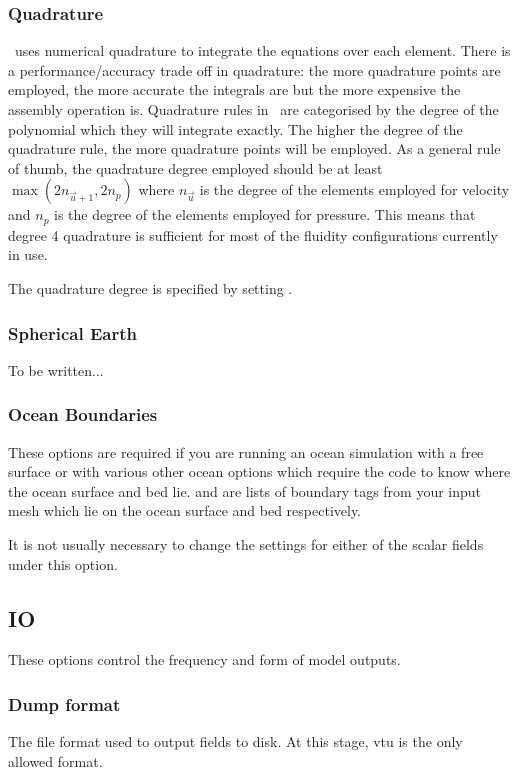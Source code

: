\subsubsection{Quadrature}
\fluidity\ uses numerical quadrature to integrate the equations over each
element. There is a performance/accuracy trade off in quadrature: the more
quadrature points are employed, the more accurate the integrals are but
the more expensive the assembly operation is. Quadrature rules in \fluidity\ are categorised by the degree of the polynomial which they will integrate
exactly. The higher the degree of the quadrature rule, the more quadrature
points will be employed. As a general rule of thumb, the quadrature
degree employed should be at least $\max(2n_{\vec{u}+1},2n_p)$ where
$n_{\vec{u}}$ is the degree of the elements employed for velocity and $n_p$
is the degree of the elements employed for pressure. This means that degree
4 quadrature is sufficient for most of the fluidity configurations currently
in use.

The quadrature degree is specified by setting .

\subsubsection{Spherical Earth}
To be written...

\subsubsection{Ocean Boundaries}\label{sec:ocean_boundaries}
These options are required if you are running an ocean simulation with a
free surface or with various other ocean options which require the code to
know where the ocean surface and bed lie.
 and
\onlypdf\linebreak{}
are lists of boundary tags from your input mesh which lie on the ocean
surface and bed respectively.

It is not usually necessary to change the settings for either of the scalar fields under this option. 

\subsection{IO}
These options control the frequency and form of model outputs.
\subsubsection{Dump format}
The file format used to output fields to disk. At this stage, vtu is the
only allowed format.

